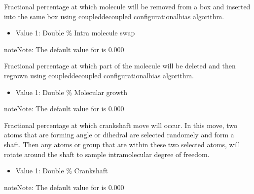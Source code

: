 \documentclass[letterpaper,10pt,english]{sphinxmanual}
\begin{document}
\begin{description}
\begin{itemize}
\end{itemize}

\item[{\sphinxcode{\sphinxupquote{IntraSwapFreq}}}] \leavevmode
Fractional percentage at which molecule will be removed from a box and inserted into the same box using coupled\sphinxhyphen{}decoupled configurational\sphinxhyphen{}bias algorithm.
\begin{itemize}
\item {} 
Value 1: Double \sphinxhyphen{} \% Intra molecule swap

\end{itemize}

\begin{sphinxadmonition}{note}{Note:}
The default value for  is 0.000
\end{sphinxadmonition}

\item[{\sphinxcode{\sphinxupquote{RegrowthFreq}}}] \leavevmode
Fractional percentage at which part of the molecule will be deleted and then regrown using coupled\sphinxhyphen{}decoupled configurational\sphinxhyphen{}bias algorithm.
\begin{itemize}
\item {} 
Value 1: Double \sphinxhyphen{} \% Molecular growth

\end{itemize}

\begin{sphinxadmonition}{note}{Note:}
The default value for  is 0.000
\end{sphinxadmonition}

\item[{\sphinxcode{\sphinxupquote{CrankShaftFreq}}}] \leavevmode
Fractional percentage at which crankshaft move will occur. In this move, two atoms that are forming angle or dihedral are selected randomely and form a shaft.
Then any atoms or group that are within these two selected atoms, will rotate around the shaft to sample intramolecular degree of freedom.
\begin{itemize}
\item {} 
Value 1: Double \sphinxhyphen{} \% Crankshaft

\end{itemize}

\begin{sphinxadmonition}{note}{Note:}
The default value for  is 0.000
\end{sphinxadmonition}


\end{description}
\end{document}

